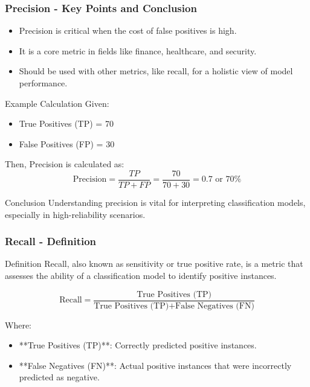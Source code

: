 \documentclass[aspectratio=169]{beamer}
\begin{document}
\begin{frame}[fragile]
    \frametitle{Precision - Key Points and Conclusion}
    \begin{itemize}
        \item Precision is critical when the cost of false positives is high.
        \item It is a core metric in fields like finance, healthcare, and security.
        \item Should be used with other metrics, like recall, for a holistic view of model performance.
    \end{itemize}
    
    \begin{block}{Example Calculation}
        Given:
        \begin{itemize}
            \item True Positives (TP) = 70
            \item False Positives (FP) = 30
        \end{itemize}
        Then, Precision is calculated as:
        \begin{equation}
            \text{Precision} = \frac{TP}{TP + FP} = \frac{70}{70 + 30} = 0.7 \text{ or } 70\%
        \end{equation}
    \end{block}

    \begin{block}{Conclusion}
        Understanding precision is vital for interpreting classification models, especially in high-reliability scenarios.
    \end{block}
\end{frame}

\begin{frame}[fragile]
    \frametitle{Recall - Definition}
    
    \begin{block}{Definition}
        Recall, also known as sensitivity or true positive rate, is a metric that assesses the ability of a classification model to identify positive instances. 
    \end{block}
    
    \begin{equation}
    \text{Recall} = \frac{\text{True Positives (TP)}}{\text{True Positives (TP)} + \text{False Negatives (FN)}}
    \end{equation}
    
    Where:
    \begin{itemize}
        \item **True Positives (TP)**: Correctly predicted positive instances.
        \item **False Negatives (FN)**: Actual positive instances that were incorrectly predicted as negative.
    \end{itemize}
\end{frame}
\end{document}
